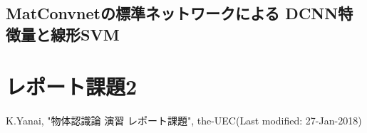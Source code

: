 \documentclass[11pt,a4paper, uplatex]{jsreport}
\begin{document}
\subsection{MatConvnetの標準ネットワークによる DCNN特徴量と線形SVM}



\section{レポート課題2}

\begin{thebibliography}{数字}
   K.Yanai, "物体認識論 演習 レポート課題", the-UEC(Last modified: 27-Jan-2018)
\end{thebibliography}
\end{document}
